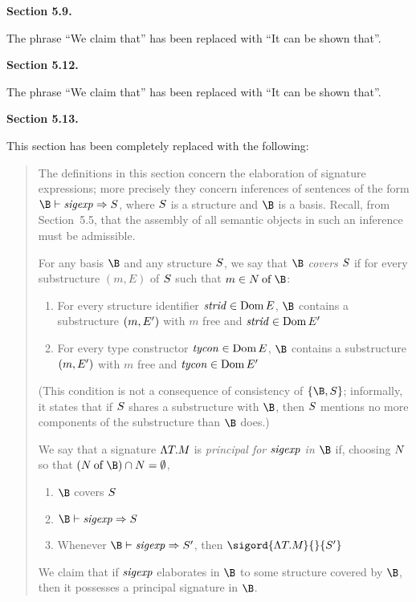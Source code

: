 {\samepage
\noindent
{\bf Section 5.9.}
\medskip

\noindent
The phrase ``We claim that'' has been replaced with ``It can be shown that''.
\bigskip

}
{\samepage
\noindent
{\bf Section 5.12.}
\medskip

\noindent
The phrase ``We claim that'' has been replaced with ``It can be shown that''.
\bigskip

}
{\samepage
\noindent
{\bf Section 5.13.}
\medskip

\noindent
This section has been completely replaced with the following:

}
\begin{quotation}
\noindent
The definitions in this section concern the elaboration of signature
expressions; more precisely they concern inferences of sentences of the
form $\B\ts\sigexp\ra\S$, where $\S$ is a structure and $\B$ is a basis.
Recall, from Section~5.5, that the assembly of all semantic
objects in such an inference must be admissible.

For any basis $\B$ and any structure $\S$,
we say that $\B$ {\sl covers} $\S$
if for every substructure $(m,E)$ of $\S$ such that
$m\in\of{\N}{\B}$:
\begin{enumerate}
\item
For every structure identifier $\strid\in\Dom\E$,
$\B$ contains a substructure $(m,\E')$ with $m$
free and $\strid\in\Dom\E'$
\item
For every type constructor $\tycon\in\Dom\E$,
$\B$ contains a substructure $(m,\E')$ with $m$ free
and $\tycon\in\Dom\E'$
\end{enumerate}
(This condition is not a consequence of consistency of $\{\B,\S\}$;
informally, it states that if $\S$ shares a substructure with $\B$,
then $\S$ mentions no more components of the substructure than
$\B$ does.)

We say that a signature
$\longsig{}$ is {\sl principal for $\sigexp$ in $\B$} if, choosing $\N$
so that $(\of{\N}{\B})\cap\N=\emptyset$,
\begin{enumerate}
\item $\B$ covers $\S$
\item $\B\vdash\sigexp\ra\S$
\item Whenever $\B\vdash\sigexp\ra\S'$, then $\sigord{\longsig{}}{}{\S'}$
\end{enumerate}
We claim that if $\sigexp$ elaborates in $\B$ to some structure covered
by $\B$, then it possesses a principal signature in $\B$.


\end{quotation}
